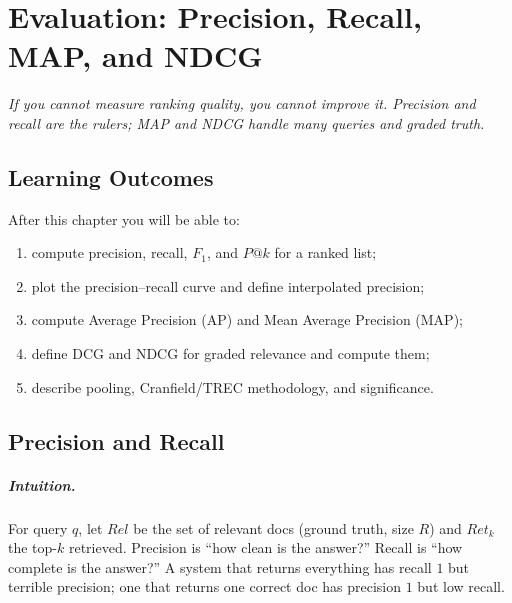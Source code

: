 \chapter{Evaluation: Precision, Recall, MAP, and NDCG}\label{ch:evaluation}
\begin{center}\small\textit{If you cannot measure ranking quality, you cannot improve it. Precision and recall are the rulers; MAP and NDCG handle many queries and graded truth.}\end{center}

\noindent{}
\vspace{0.4em}

\section*{Learning Outcomes}
After this chapter you will be able to:
\begin{enumerate}[label=(L\arabic*)]
  \item compute precision, recall, $F_1$, and $P@k$ for a ranked list;
  \item plot the precision--recall curve and define interpolated precision;
  \item compute Average Precision (AP) and Mean Average Precision (MAP);
  \item define DCG and NDCG for graded relevance and compute them;
  \item describe pooling, Cranfield/TREC methodology, and significance.
\end{enumerate}

\section{Precision and Recall}\label{sec:pr}
\paragraph{Intuition.} For query $q$, let $Rel$ be the set of relevant docs (ground truth, size $R$) and $Ret_k$ the top-$k$ retrieved. Precision is ``how clean is the answer?'' Recall is ``how complete is the answer?'' A system that returns everything has recall $1$ but terrible precision; one that returns one correct doc has precision $1$ but low recall.


